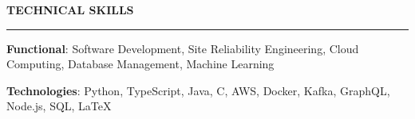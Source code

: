 \documentclass{cv}
\begin{document}

\sectionskip


\textbf{\uppercase{Technical Skills}}
\sectionlineskip
\hrule height 0.6pt
\begin{list}{}{\setlength{\leftmargin}{0pt}}
\itemsep -2.0pt
\item
    \textbf{Functional}: Software Development, Site Reliability Engineering, Cloud Computing, Database Management, Machine Learning
\item
    \textbf{Technologies}: Python, TypeScript, Java, C, AWS, Docker, Kafka, GraphQL, Node.js, SQL, \LaTeX
\end{list}


\sectionskip

\end{document}
